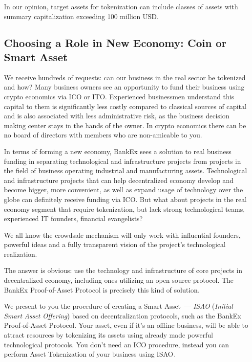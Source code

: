 \documentclass{article}
\begin{document}
\begin{multicols}{2}
In our opinion, target assets for tokenization can include classes of assets with summary capitalization exceeding 100 million USD. 

\subsection{Choosing a Role in New Economy: Coin or Smart Asset}

We receive hundreds of requests: can our business in the real sector be tokenized and how? Many business owners see an opportunity to fund their business using crypto economics via ICO or ITO. Experienced businessmen understand this capital to them is significantly less costly compared to classical sources of capital and is also associated with less administrative risk, as the business decision making center stays in the hands of the owner. In crypto economics there can be no board of directors with members who are non-amicable to you.  

In terms of forming a new economy, BankEx sees a solution to real business funding in separating technological and infrastructure projects from projects in the field of business operating industrial and manufacturing assets. Technological and infrastructure projects that can help decentralized economy develop and become bigger, more convenient, as well as expand usage of technology over the globe can definitely receive funding via ICO. But what about projects in the real economy segment that require tokenization, but lack strong technological teams, experienced IT founders, financial evangelists?

We all know the crowdsale mechanism will only work with influential founders, powerful ideas and a fully transparent vision of the project’s technological realization.  

The answer is obvious: use the technology and infrastructure of core projects in decentralized economy, including ones utilizing an open source protocol. The BankEx Proof-of-Asset Protocol is precisely this kind of solution. 

We present to you the procedure of creating a Smart Asset~--- \textit{ISAO} (\textit{Initial Smart Asset Offering}) based on decentralization protocols, such as the BankEx Proof-of-Asset Protocol. Your asset, even if it’s an offline business, will be able to attract resources by tokenizing its assets using already made powerful technological protocols. You don’t need an ICO procedure, instead you can perform Asset Tokenization of your business using ISAO. 


\end{multicols}
\end{document}
